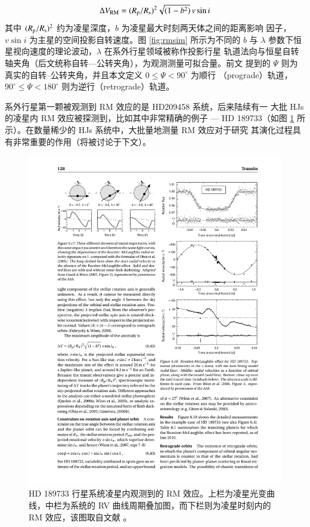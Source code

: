 \begin{equation} \label{eq:rvdvofrm}
\Delta V_\mathrm{RM} = (R_\mathrm{p} / R_\mathrm{s})^2 \sqrt{(1-b^2)} \, v\sin i
\end{equation} %
其中 $(R_\mathrm{p} / R_\mathrm{s})^2$ 约为凌星深度，$b$ 为凌星最大时刻两天体之间的距离影响
因子，$v\sin i$ 为主星的空间投影自转速度。图 \ref{fig:rmsim} 所示为不同的 $b$ 与 
$\lambda$ 参数下恒星视向速度的理论波动，$\lambda$ 在系外行星领域被称作投影行星
轨道法向与恒星自转轴夹角（后文统称自转---公转夹角），为观测测量可拟合量。前文
提到的 $\Psi$ 则为真实的自转--公转夹角，并且本文定义 $0 \leq \Psi < 90^\circ$ 为顺行
（prograde）轨道，$90^\circ \leq \Psi < 180^\circ $ 则为逆行（retrograde）轨道。


系外行星第一颗被观测到 RM 效应的是 HD209458 系统\cite{Queloz2000}，后来陆续有一
大批 HJs 的凌星内 RM 效应被探测到，比如其中非常精确的例子 --- HD 189733（如图 
\ref{fig:rmhd189733}  所示）。在数量稀少的 HJs 系统中，大批量地测量 RM 效应对于研究
其演化过程具有非常重要的作用（将被讨论于下文）。


\begin{figure}[t]
\centering
\includegraphics[height=0.95\textheight]{figures/chapter4/fig6_RMHD189733.pdf}
\caption[HD 189733 行星系统凌星内观测到的 RM 效应。上栏为凌星光变曲线，中栏为系统的 RV 曲线周期叠加图，而下栏则为凌星时刻内的 RM 效应，该图版权 Winn 等。]{HD 189733 行星系统凌星内观测到的 RM 效应。上栏为凌星光变曲线，中栏为系统的 RV 曲线周期叠加图，而下栏则为凌星时刻内的 RM 效应，该图取自文献 。}
\label{fig:rmhd189733}
\end{figure}


